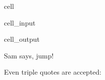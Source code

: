 \documentclass[letterpaper,10pt,english]{jupyterBook}
\begin{document}
\begin{sphinxuseclass}{cell}\begin{sphinxVerbatimInput}

\begin{sphinxuseclass}{cell_input}
\begin{sphinxVerbatim}[commandchars=\\\{\}]
\end{sphinxVerbatim}

\end{sphinxuseclass}\end{sphinxVerbatimInput}
\begin{sphinxVerbatimOutput}

\begin{sphinxuseclass}{cell_output}
\begin{sphinxVerbatim}[commandchars=\\\{\}]
\PYGZsq{}Sam says, \PYGZdq{}jump!\PYGZdq{}\PYGZsq{}
\end{sphinxVerbatim}

\end{sphinxuseclass}\end{sphinxVerbatimOutput}

\end{sphinxuseclass}
\sphinxAtStartPar
Even triple quotes are accepted:
\end{document}
